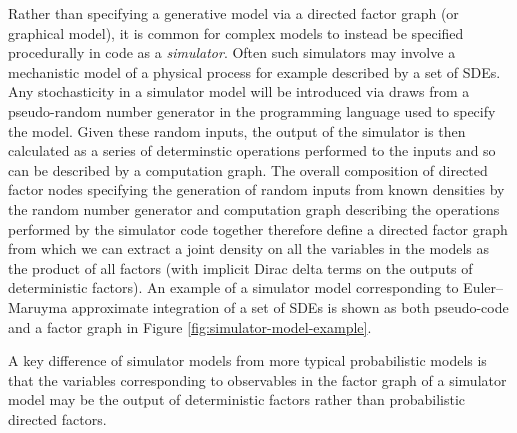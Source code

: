 Rather than specifying a generative model via a directed factor graph (or graphical model), it is common for complex models to instead be specified procedurally in code as a \emph{simulator}. Often such simulators may involve a mechanistic model of a physical process for example described by a set of \acfp{SDE}. Any stochasticity in a simulator model will be introduced via draws from a pseudo-random number generator in the programming language used to specify the model. Given these random inputs, the output of the simulator is then calculated as a series of determinstic operations performed to the inputs and so can be described by a computation graph. The overall composition of directed factor nodes specifying the generation of random inputs from known densities by the random number generator and computation graph describing the operations performed by the simulator code together therefore define a directed factor graph from which we can extract a joint density on all the variables in the models as the product of all factors (with implicit Dirac delta terms on the outputs of deterministic factors).  An example of a simulator model corresponding to Euler--Maruyma approximate integration \citep{kloeden1992numerical} of a set of \acp{SDE} is shown as both pseudo-code and a factor graph in Figure \ref{fig:simulator-model-example}.

A key difference of simulator models from more typical probabilistic models is that the variables corresponding to observables in the factor graph of a simulator model may be the output of deterministic factors rather than probabilistic directed factors. %